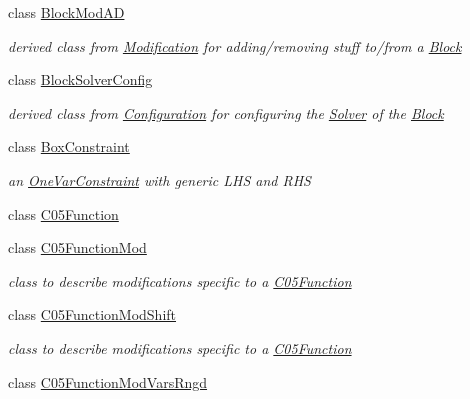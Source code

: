 \begin{DoxyCompactItemize}
class \mbox{\hyperlink{class_s_m_spp__di__unipi__it_1_1_block_mod_a_d}{Block\+Mod\+AD}}
\begin{DoxyCompactList}\small\item\em derived class from \mbox{\hyperlink{class_s_m_spp__di__unipi__it_1_1_modification}{Modification}} for adding/removing stuff to/from a \mbox{\hyperlink{class_s_m_spp__di__unipi__it_1_1_block}{Block}} \end{DoxyCompactList}\item 
class \mbox{\hyperlink{class_s_m_spp__di__unipi__it_1_1_block_solver_config}{Block\+Solver\+Config}}
\begin{DoxyCompactList}\small\item\em derived class from \mbox{\hyperlink{class_s_m_spp__di__unipi__it_1_1_configuration}{Configuration}} for configuring the \mbox{\hyperlink{class_s_m_spp__di__unipi__it_1_1_solver}{Solver}} of the \mbox{\hyperlink{class_s_m_spp__di__unipi__it_1_1_block}{Block}} \end{DoxyCompactList}\item 
class \mbox{\hyperlink{class_s_m_spp__di__unipi__it_1_1_box_constraint}{Box\+Constraint}}
\begin{DoxyCompactList}\small\item\em an \mbox{\hyperlink{class_s_m_spp__di__unipi__it_1_1_one_var_constraint}{One\+Var\+Constraint}} with generic L\+HS and R\+HS \end{DoxyCompactList}\item 
class \mbox{\hyperlink{class_s_m_spp__di__unipi__it_1_1_c05_function}{C05\+Function}}
\item 
class \mbox{\hyperlink{class_s_m_spp__di__unipi__it_1_1_c05_function_mod}{C05\+Function\+Mod}}
\begin{DoxyCompactList}\small\item\em class to describe modifications specific to a \mbox{\hyperlink{class_s_m_spp__di__unipi__it_1_1_c05_function}{C05\+Function}} \end{DoxyCompactList}\item 
class \mbox{\hyperlink{class_s_m_spp__di__unipi__it_1_1_c05_function_mod_shift}{C05\+Function\+Mod\+Shift}}
\begin{DoxyCompactList}\small\item\em class to describe modifications specific to a \mbox{\hyperlink{class_s_m_spp__di__unipi__it_1_1_c05_function}{C05\+Function}} \end{DoxyCompactList}\item 
class \mbox{\hyperlink{class_s_m_spp__di__unipi__it_1_1_c05_function_mod_vars_rngd}{C05\+Function\+Mod\+Vars\+Rngd}}

\end{DoxyCompactItemize}
